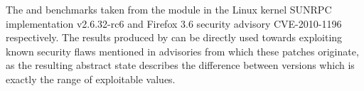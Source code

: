 The  and  benchmarks taken from the  module in the Linux kernel SUNRPC implementation v2.6.32-rc6 and Firefox 3.6 security advisory CVE-2010-1196 respectively. The results produced by \tool can be directly used towards exploiting known security flaws mentioned in advisories from which these patches originate, as the resulting abstract state describes the difference between versions which is exactly the range of exploitable values.

%
%
%
%
